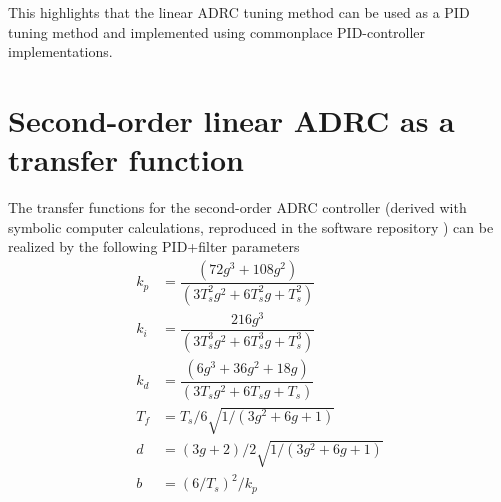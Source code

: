 \documentclass[letterpaper, 10 pt, conference]{ieeeconf}
\begin{document}
This highlights that the linear ADRC tuning method can be used as a PID tuning method and implemented using commonplace PID-controller implementations.






\appendix

\section{Second-order linear ADRC as a transfer function}
The transfer functions for the second-order ADRC controller (derived with symbolic computer calculations, reproduced in the software repository \cite{repo}) can be realized by the following PID+filter parameters
\begin{align}
	k_p &= \dfrac{(72g^3 + 108g^2)}{(3T_s^2 g^2 + 6T_s^2 g + T_s^2)} \\
	k_i &= \dfrac{216g^3}{(3T_s^3 g^2 + 6T_s^3 g + T_s^3)} \\
	k_d &= \dfrac{(6g^3 + 36g^2 + 18g)}{(3T_s g^2 + 6T_s g + T_s)} \\
	T_f &= T_s/6 \sqrt{1/(3g^2 + 6g + 1)} \\
	d &= (3g + 2)/2 \sqrt{1/(3g^2 + 6g + 1)} \\
	b &= (6/T_s)^2 / k_p
\end{align}
\end{document}
